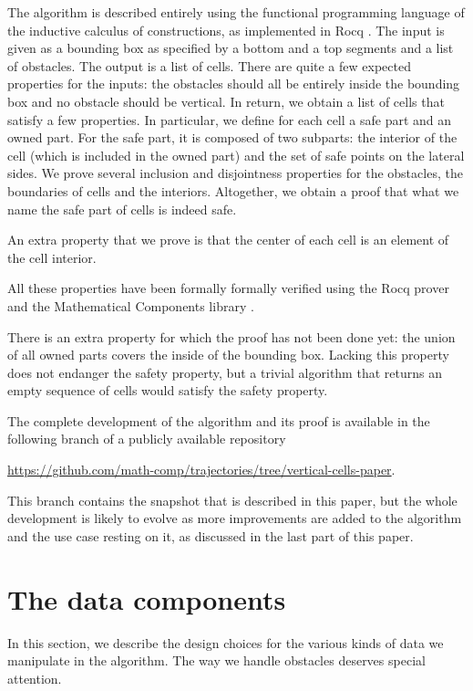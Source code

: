\documentclass[a4paper, USenglish, cleveref, autoref, thm-restate, final]{lipics-v2021}
\begin{document}
The algorithm is described entirely using the functional programming
language of the inductive calculus of constructions, as implemented in
Rocq \cite{the_coq_development_team_2024_14542673}.  The input is given as a bounding box as specified by a bottom and
a top segments and a list of obstacles.
The output is a list of cells.  There are quite a few expected
properties for the inputs: the obstacles should all be entirely inside
the bounding box and no obstacle should be vertical.  In return, we
obtain a list of cells that satisfy a few properties.  In particular,
we define for each cell a safe part and an owned part.  For the safe part,
it is composed of two subparts: the interior of the cell (which is included in
the owned part) and the set of safe points on the lateral sides.  We
prove several inclusion and disjointness properties for the obstacles, the
boundaries of cells and the interiors.  Altogether, we obtain a proof that
what we name the safe part of cells is indeed safe.

An extra property that we prove is that the center of each cell is an
element of the cell interior.

All these properties have been formally formally verified using the
Rocq prover and the {\sc Mathematical Components} library
\cite{assia_mahboubi_2022_7118596}.

There is an extra property for which the proof has not been done yet:
the union of all owned parts covers the inside of the bounding box.  Lacking
this property does not endanger the safety property, but a trivial algorithm
that returns an empty sequence of cells would satisfy the safety property.

The complete development of the algorithm and its proof is available
in the following branch of a publicly available repository
\begin{center}
\url{https://github.com/math-comp/trajectories/tree/vertical-cells-paper}.
\end{center}
This branch contains the snapshot that is described in this paper, but
the whole development is likely to evolve as more improvements are
added to the algorithm and the use case resting on it, as discussed in the
last part of this paper.

\section{The data components}
In this section, we describe the design choices for the various kinds
of data we manipulate in the algorithm.  The way we handle obstacles
deserves special attention.
\end{document}
